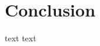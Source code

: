 \documentclass[10pt,journal,cspaper,compsoc]{IEEEtran}
\begin{document}
\section{Conclusion}\label{s:conclusion}

text text





%



\end{document}
